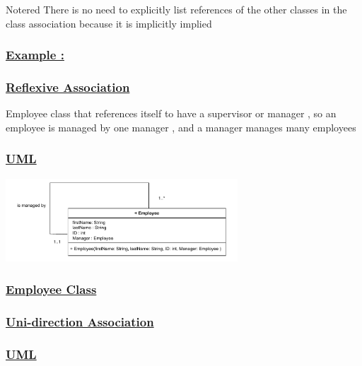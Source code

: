 \vspace{0.25cm}

\begin{prettyBox}{Note}{red}
There is no need to explicitly list references of the other classes in the class association
because it is implicitly implied
\end{prettyBox}

\subsubsection*{\underline{Example :}}

\subsubsection*{\underline{Reflexive Association}}
Employee class that references itself to have a supervisor or manager , so an employee is managed by one manager , and a manager manages many employees 

\subsubsection*{\underline{UML}}

\begin{center}
\includegraphics[width=0.65\textwidth]{Chapters/Diagram/OOP/EX2/ex2.a.drawio.pdf}
\end{center}


\subsubsection*{\underline{Employee Class}}



\subsubsection*{\underline{Uni-direction Association}}
\subsubsection*{\underline{UML}}

